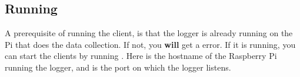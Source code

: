 \subsection{Running}
A prerequisite of running the client, is that the logger is already running on the Pi that does the data collection. If not, you \textbf{will} get a  error. If it is running, you can start the clients by running . Here  is the hostname of the Raspberry Pi running the logger, and  is the port on which the logger listens.